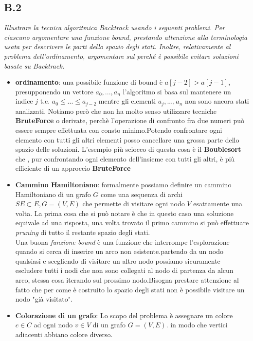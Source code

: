 \documentclass[a4paper]{article}
\begin{document}
\subsection{B.2}
\emph{Illustrare la tecnica algoritmica Backtrack usando i seguenti problemi. Per ciascuno argomentare una funzione bound, prestando attenzione alla terminologia usata per descrivere le parti dello spazio degli stati. Inoltre, relativamente al problema dell’ordinamento, argomentare sul perché è possibile evitare soluzioni basate su Backtrack.}

\begin{itemize}
	\item \textbf{ordinamento}: una possibile funzione di bound è $a[j-2] > a[j-1]$, presupponendo un vettore $a_0, ... , a_n$ l'algoritmo si basa sul mantenere un indice $j$ t.c. $a_0 \leq ... \leq a_{j-2}$ mentre gli elementi $a_{j}, ..., a_{n}$ non sono ancora stati analizzati.
	Notiamo però che non ha molto senso utilizzare tecniche \textbf{BruteForce} o derivate, perchè l'operazione di confronto fra due numeri può essere sempre effettuata con consto minimo.Potendo confrontare ogni elemento con tutti gli altri elementi posso cancellare una grossa parte dello spazio delle soluzioni.
	L'esempio più sciocco di questa cosa è il \textbf{Boublesort} che , pur confrontando ogni elemento dell'insieme con tutti gli altri, è più efficiente di un approccio \textbf{BruteForce}
	\item \textbf{Cammino Hamiltoniano}: formalmente possiamo definire un cammino Hamiltoniano di un grafo $G$ come una sequenza di archi $SE \subset E, G= (V,E)$ che permette di visitare ogni nodo $V$ esattamente una volta.
	La prima cosa che si può notare è che in questo caso una soluzione equivale ad una risposta, una volta trovato il primo cammino si può effettuare \textit{pruning} di tutto il restante spazio degli stati.\\
	Una buona \textit{funzione bound} è una funzione che interrompe l'esplorazione quando si cerca di inserire un arco non esistente.partendo da un nodo qualsiasi e scegliendo di visitare un altro nodo possiamo sicuramente escludere tutti i nodi che non sono collegati al nodo di partenza da alcun arco, stessa cosa iterando sul prossimo nodo.Bisogna prestare attenzione al fatto che per come è costruito lo spazio degli stati non è possibile visitare un nodo "già visitato".
	\item \textbf{Colorazione di un grafo}: Lo scopo del problema è assegnare un colore $c \in C$ ad ogni nodo $v \in V$ di un grafo $G=(V,E)$. in modo che vertici adiacenti abbiano colore diverso.\\

\end{itemize}
\end{document}
